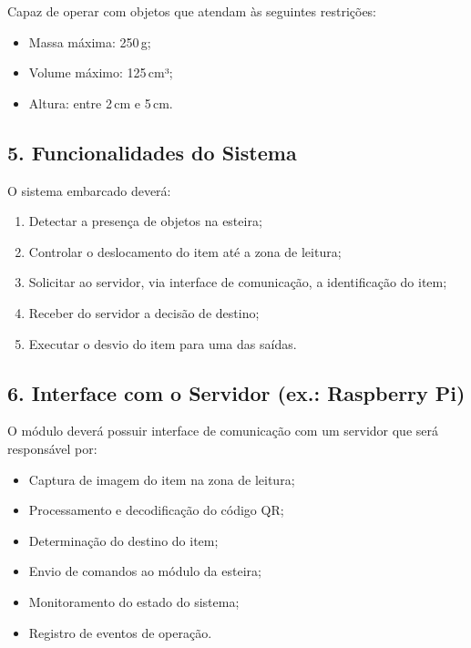 Capaz de operar com objetos que atendam às seguintes restrições:

\begin{itemize}
    \item Massa máxima: 250\,g;
    \item Volume máximo: 125\,cm³;
    \item Altura: entre 2\,cm e 5\,cm.
\end{itemize}

\subsection*{5. Funcionalidades do Sistema}

O sistema embarcado deverá:

\begin{enumerate}
    \item Detectar a presença de objetos na esteira;
    \item Controlar o deslocamento do item até a zona de leitura;
    \item Solicitar ao servidor, via interface de comunicação, a identificação
          do item;
    \item Receber do servidor a decisão de destino;
    \item Executar o desvio do item para uma das saídas.
\end{enumerate}

\subsection*{6. Interface com o Servidor (ex.: Raspberry Pi)}

O módulo deverá possuir interface de comunicação com um servidor que será
responsável por:

\begin{itemize}
    \item Captura de imagem do item na zona de leitura;
    \item Processamento e decodificação do código QR;
    \item Determinação do destino do item;
    \item Envio de comandos ao módulo da esteira;
    \item Monitoramento do estado do sistema;
    \item Registro de eventos de operação.
\end{itemize}

